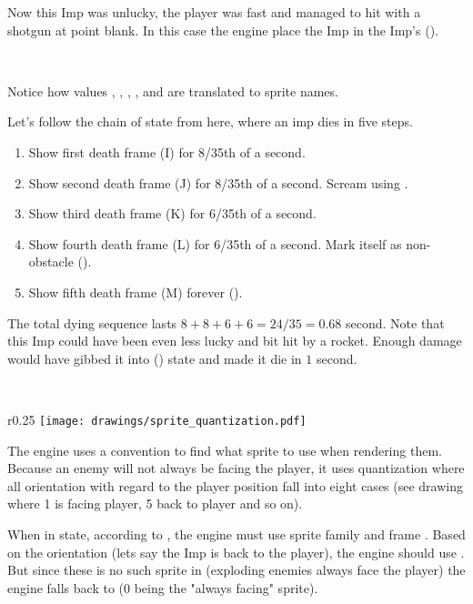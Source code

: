 Now this Imp was unlucky, the player was fast and managed to hit with a shotgun at point blank. In this case the engine place the Imp in the Imp's  ().\\
\par
{}\\
\par
Notice how values , , , , and  are translated to sprite names.\\
\par
{}
\par


\pagebreak
Let's follow the chain of state from here, where an imp dies in five steps.

\begin{enumerate}
\item Show first death frame (I) for 8/35th of a second.
\item Show second death frame (J) for 8/35th of a second. Scream using .
\item Show third death frame (K) for 6/35th of a second.
\item Show fourth death frame (L) for 6/35th of a second. Mark itself as non-obstacle ().
\item Show fifth death frame (M) forever ().
\end{enumerate}
\par
The total dying sequence lasts $8+8+6+6=24/35 = 0.68$ second. Note that this Imp could have been even less lucky and bit hit by a rocket. Enough damage would have gibbed it into  () state and made it die in $1$ second.\\
\par
{}\\
\par
{}




\par
\begin{wrapfigure}[9]{r}{0.25\textwidth}
\centering
\texttt{[image: drawings/sprite\_quantization.pdf]}
\end{wrapfigure}
The engine uses a convention to find what sprite to use when rendering them. Because an enemy will not always be facing the player, it uses quantization where all orientation with regard to the player position fall into eight cases (see drawing where 1 is facing player, 5 back to player and so on).\\
\par
When in  state, according to , the engine must use sprite family  and frame . Based on the orientation (lets say the Imp is back to the player), the engine should use . But since these is no such sprite in  (exploding enemies always face the player) the engine falls back to  (0 being the "always facing" sprite).
\par







